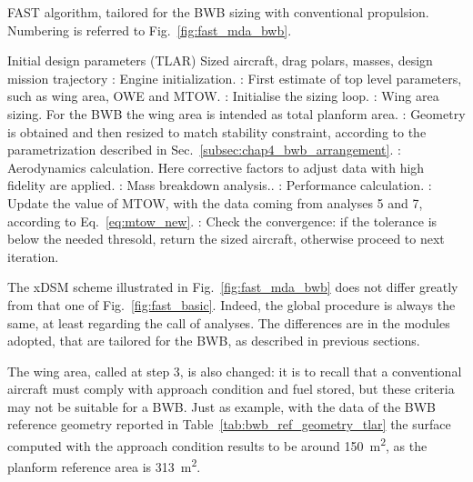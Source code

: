 \begin{algorithm}[!h]
	\caption{FAST algorithm, tailored for the BWB sizing with conventional propulsion. Numbering is referred to Fig.~\ref{fig:fast_mda_bwb}.}
	\label{alg:fast_mda_bwb}
	\begin{algorithmic}
		\REQUIRE Initial design parameters (TLAR)
		\ENSURE Sized aircraft, drag polars, masses, design mission trajectory
		: Engine initialization.
		: First estimate of top level parameters, such as wing area, OWE and MTOW.
		: Initialise the sizing loop.
		\REPEAT
		: Wing area sizing. For the BWB the wing area is intended as total planform area.
		: Geometry is obtained and then resized to match stability constraint, according to the parametrization described in Sec.~\ref{subsec:chap4_bwb_arrangement}.
		: Aerodynamics calculation. Here corrective factors to adjust data with high fidelity are applied.
		: Mass breakdown analysis..
		: Performance calculation.
		: Update the value of MTOW, with the data coming from analyses 5 and 7, according to Eq.~\eqref{eq:mtow_new}.
		: Check the convergence: if the tolerance is below the needed thresold, return the sized aircraft, otherwise proceed to next iteration.
	\end{algorithmic}
\end{algorithm}

The xDSM scheme illustrated in Fig.~\ref{fig:fast_mda_bwb} does not differ greatly from that one of Fig.~\ref{fig:fast_basic}. 
Indeed, the global procedure is always the same, at least regarding the call of analyses.
The differences are in the modules adopted, that are tailored for the BWB, as described in previous sections. 

The wing area, called at step 3, is also changed: it is to recall that a conventional aircraft must comply with approach condition and fuel stored, but these criteria may not be suitable for a BWB. 
Just as example, with the data of the BWB reference geometry reported in Table~\ref{tab:bwb_ref_geometry_tlar} the surface computed with the approach condition results to be around 150~\si{\square\meter}, as the planform reference area is 313~\si{\square\meter}. 

